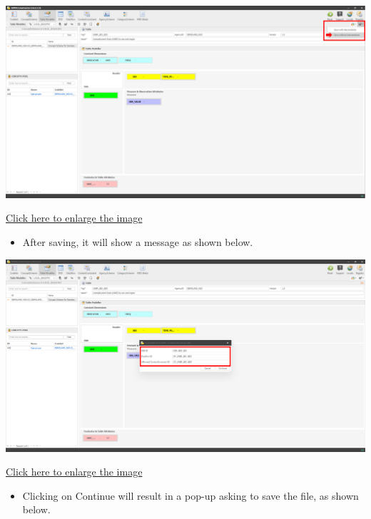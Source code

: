 \documentclass[
]{book}
\providecommand{\tightlist}{%
  \setlength{\itemsep}{0pt}\setlength{\parskip}{0pt}}
\begin{document}
\begin{center}\includegraphics[width=1\linewidth]{./images/image144} \end{center}

\href{images/image144.png}{Click here to enlarge the image}

\begin{itemize}
\tightlist
\item
  After saving, it will show a message as shown below.
\end{itemize}

\begin{center}\includegraphics[width=1\linewidth]{./images/image146} \end{center}

\href{images/image146.png}{Click here to enlarge the image}

\begin{itemize}
\tightlist
\item
  Clicking on Continue will result in a pop-up asking to save the file, as shown below.
\end{itemize}
\end{document}
